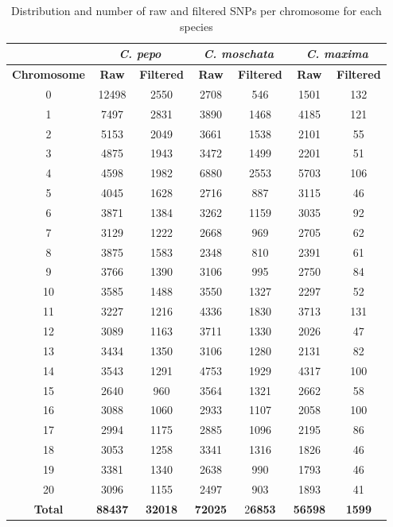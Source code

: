 \documentclass[utf8]{FrontiersinHarvard} %
\begin{document}
\begin{table}[h]
	\begin{center}
\begin{tabular}{c c c c c c c}
	\hline
	& \multicolumn{2}{c}{\textbf{\textit{C. pepo}}} & \multicolumn{2}{c}{\textbf{\textit{C. moschata}}}& \multicolumn{2}{c}{\textbf{\textit{C. maxima}}} \\
	\hline
	\textbf{Chromosome} & \textbf{Raw} & \textbf{Filtered} & \textbf{Raw} & \textbf{Filtered} & \textbf{Raw} & \textbf{Filtered} \\
	\hline
	0 & 12498 & 2550 & 2708 & 546 & 1501 & 132 \\
	1 & 7497 & 2831 & 3890 & 1468 & 4185 & 121 \\
	2 & 5153 & 2049 & 3661 & 1538 & 2101 & 55 \\
	3 & 4875 & 1943 & 3472 & 1499 & 2201 & 51 \\
	4 & 4598 & 1982 & 6880 & 2553 & 5703 & 106 \\
	5 & 4045 & 1628 & 2716 & 887 & 3115 & 46 \\
	6 & 3871 & 1384 & 3262 & 1159 & 3035 & 92 \\
	7 & 3129 & 1222 & 2668 & 969 & 2705 & 62 \\
	8 & 3875 & 1583 & 2348 & 810 & 2391 & 61 \\
	9 & 3766 & 1390 & 3106 & 995 & 2750 & 84 \\
	10 & 3585 & 1488 & 3550 & 1327 & 2297 & 52 \\
	11 & 3227 & 1216 & 4336 & 1830 & 3713 & 131 \\
	12 & 3089 & 1163 & 3711 & 1330 & 2026 & 47 \\
	13 & 3434 & 1350 & 3106 & 1280 & 2131 & 82 \\
	14 & 3543 & 1291 & 4753 & 1929 & 4317 & 100 \\
	15 & 2640 & 960 & 3564 & 1321 & 2662 & 58 \\
	16 & 3088 & 1060 & 2933 & 1107 & 2058 & 100 \\
	17 & 2994 & 1175 & 2885 & 1096 & 2195 & 86 \\
	18 & 3053 & 1258 & 3341 & 1316 & 1826 & 46 \\
	19 & 3381 & 1340 & 2638 & 990 & 1793 & 46 \\
	20 & 3096 & 1155 & 2497 & 903 & 1893 & 41 \\
	\hline
	\textbf{Total} & \textbf{88437} & \textbf{32018} & \textbf{72025} & 2\textbf{6853} & \textbf{56598} & \textbf{1599} \\
	\hline
\end{tabular}
	\caption{Distribution and number of raw and filtered SNPs per chromosome for each species \label{tbl:1}}
	\end{center}
\end{table}
\end{document}
